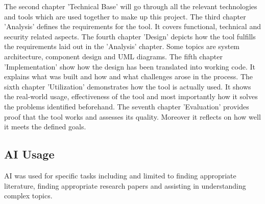 The second chapter 'Technical Base' will go through all the relevant technologies and tools which are used together to make up this project. \newline\newline The third chapter 'Analysis' defines the requirements for the tool. It covers functional, technical and security related aspects. \newline\newline The fourth chapter 'Design' depicts how the tool fulfills the requirements laid out in the 'Analysis' chapter. Some topics are system architecture, component design and UML diagrams. \newline\newline The fifth chapter 'Implementation' show how the design has been translated into working code. It explains what was built and how and what challenges arose in the process. \newline\newline The sixth chapter 'Utilization' demonstrates how the tool is actually used. It shows the real-world usage, effectiveness of the tool and most importantly how it solves the problems identified beforehand. \newline\newline The seventh chapter 'Evaluation' provides proof that the tool works and assesses its quality. Moreover it reflects on how well it meets the defined goals. 

\subsection{AI Usage}

AI was used for specific tasks including and limited to finding appropriate literature, finding appropriate research papers and assisting in understanding complex topics.






